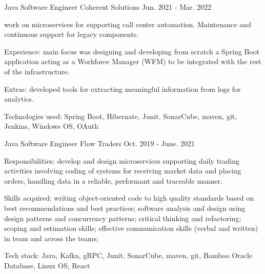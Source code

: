 \begin{cventries}
\cventry
    {Java Software Engineer} %
    {Coherent Solutions} %
    {} %
    {Jun. 2021 - Mar. 2022} %
    {
      \begin{cvitems} %
        \item {work on microservices for supporting call center automation. Maintenance and continuous support for legacy components.}
        \item {Experience: main focus was designing and developing from scratch a Spring Boot application acting as a Workforce Manager (WFM) to be integrated with the rest of the infrastructure.}
        \item {Extras: developed tools for extracting meaningful information from logs for analytics.}
        \item {Technologies used: Spring Boot, Hibernate, Junit, SonarCube, maven, git, Jenkins, Windows OS, OAuth}
      \end{cvitems}
    }

  \cventry
    {Java Software Engineer} %
    {Flow Traders} %
    {} %
    {Oct. 2019 - June. 2021} %
    {
      \begin{cvitems} %
        \item {Responsibilities: develop and design microservices supporting daily trading activities involving coding of systems for receiving market data and placing orders, handling data in a reliable, performant and traceable manner. }
        \item {Skills acquired: writing object-oriented code to high quality standards based on best recommendations and best practices; software analysis and design using design patterns and concurrency patterns; critical thinking and refactoring; scoping and estimation skills; effective communication skills (verbal and written) in team and across the teams;}
        \item {Tech stack: Java, Kafka, gRPC, Junit, SonarCube, maven, git, Bamboo Oracle Database, Linux OS, React}
      \end{cvitems}
    }


\end{cventries}
